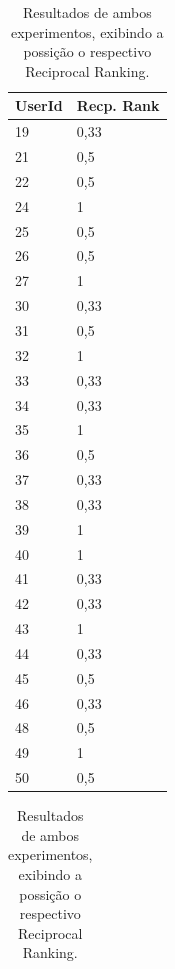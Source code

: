 \documentclass[portuguese]{textolivre}
\begin{document}
\begin{table}[htbp]
\centering
\caption{Resultados de ambos experimentos, exibindo a possição o respectivo Reciprocal Ranking.}
\label{table-results}
\begin{minipage}[t]{0.47\textwidth}
\label{table-results-a}
\centering
\begin{tabular}{ll}
\toprule
UserId  & Recp. Rank \\
\midrule
19     & 0,33    \\
21     & 0,5      \\
22    & 0,5      \\
24     & 1       \\
25    & 0,5      \\
26    & 0,5      \\
27    & 1         \\
30    & 0,33       \\
31     & 0,5       \\
32    & 1          \\
33    & 0,33       \\
34     & 0,33      \\
35     & 1         \\
36     & 0,5      \\
37     & 0,33      \\
38     & 0,33      \\
39     &  1        \\
40     &  1        \\
41     &  0,33        \\
42     &  0,33        \\
43     &  1        \\
44     &  0,33        \\
45     &  0,5        \\
46     &  0,33        \\
48     &  0,5        \\
49     &  1        \\
50     &  0,5        \\
\bottomrule
\end{tabular}
\end{minipage}
\hfill
\begin{minipage}[t]{0.47\textwidth}
\centering
{}
\label{table-results-b}
\begin{tabular}{ll}

\end{tabular}
\end{minipage}
\end{table}
\end{document}
